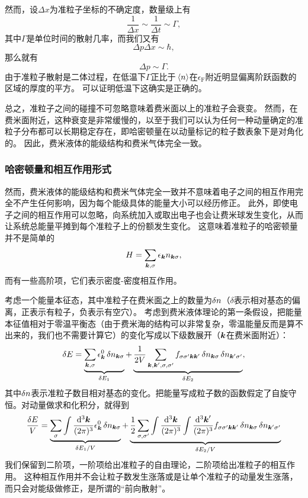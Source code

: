 \documentclass[hyperref, UTF8, a4paper]{ctexart}
\begin{document}
然而，设$\Delta x$为准粒子坐标的不确定度，数量级上有
\[
    \frac{1}{\Delta x} \sim \frac{1}{\Delta t} \sim \Gamma,
\]
其中$\Gamma$是单位时间的散射几率，而我们又有
\[
    \Delta p \Delta x \sim \hbar,
\]
那么就有
\[
    \Delta p \sim \Gamma.
\]
由于准粒子散射是二体过程，在低温下$\Gamma$正比于$\expval*{{n}}$在$\epsilon_\text{F}$附近明显偏离阶跃函数的区域的厚度的平方。
可以证明低温下这确实是正确的。

总之，准粒子之间的碰撞不可忽略意味着费米面以上的准粒子会衰变。
然而，在费米面附近，这种衰变是非常缓慢的，以至于我们可以认为任何一种动量确定的准粒子分布都可以长期稳定存在，即哈密顿量在以动量标记的粒子数表象下是对角化的。
因此，费米液体的能级结构和费米气体完全一致。

\subsubsection{哈密顿量和相互作用形式}

然而，费米液体的能级结构和费米气体完全一致并不意味着电子之间的相互作用完全不产生任何影响，因为每个能级具体的能量大小可以经历修正。
此外，即使电子之间的相互作用可以忽略，向系统加入或取出电子也会让费米球发生变化，从而让系统总能量平摊到每个准粒子上的份额发生变化。
这意味着准粒子的哈密顿量并不是简单的
\[
    H = \sum_{\vb*{k}, \sigma} \epsilon_{\vb*{k}} n_{\vb*{k} \sigma},
\]
而有一些高阶项，它们表示密度-密度相互作用。

考虑一个能量本征态，其中准粒子在费米面之上的数量为$\var{n}$（$\delta$表示相对基态的偏离，正表示有粒子，负表示有空穴）。
考虑到费米液体理论的第一条假设，把能量本征值相对于零温平衡态（由于费米海的结构可以非常复杂，零温能量反而是算不出来的，我们也不需要计算它）的变化写成以下级数展开（$\vb*{k}$在费米面附近）：
\begin{equation}
    \var{E} = \underbrace{\sum_{\vb*{k}, \sigma} \epsilon^0_{\vb*{k}} \var{n_{\vb*{k} \sigma}}}_{\var{E_1}} + \underbrace{\frac{1}{2V} \sum_{\vb*{k}, \vb*{k}', \sigma, \sigma'} f_{\sigma \sigma' \vb*{k} \vb*{k}'} \var{n_{\vb*{k} \sigma}} \var{n_{\vb*{k}' \sigma'}}}_{\var{E_2}},
    \label{eq:fermi-liquid-energy}
\end{equation}
其中$\var{n}$表示准粒子数目相对基态的变化。把能量写成粒子数的函数假定了自旋守恒。对动量做求和化积分，就得到
\begin{equation}
    \frac{\var{E}}{V} = \underbrace{\sum_{\sigma} \int \frac{\dd[3]{\vb*{k}}}{(2\pi)^3} \epsilon^0_{\vb*{k}} \var{n_{\vb*{k} \sigma}}}_{\var{E_1} / V} + \underbrace{\frac{1}{2} \sum_{\sigma, \sigma'} \int \frac{\dd[3]{\vb*{k}}}{(2\pi)^3} \int \frac{\dd[3]{\vb*{k}'}}{(2\pi)^3} f_{\sigma \sigma' \vb*{k} \vb*{k}'} \var{n_{\vb*{k} \sigma}} \var{n_{\vb*{k}' \sigma'}}}_{\var{E_2} / V}
\end{equation}
我们保留到二阶项，一阶项给出准粒子的自由理论，二阶项给出准粒子的相互作用。
这种相互作用并不会让粒子数发生涨落或是让单个准粒子的动量发生涨落，而只会对能级做修正，是所谓的“前向散射”。
\end{document}
